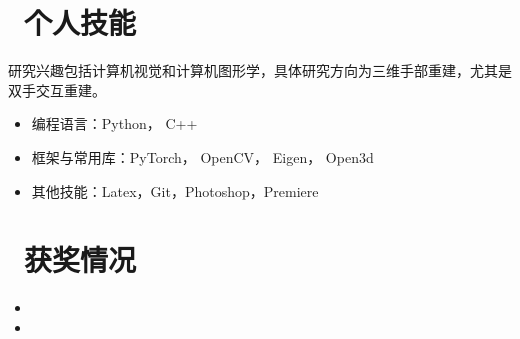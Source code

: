 \documentclass{resume}
\begin{document}
\section{\faCogs\ 个人技能}
研究兴趣包括计算机视觉和计算机图形学，具体研究方向为三维手部重建，尤其是双手交互重建。
\begin{itemize}
  \item 编程语言：Python， C++
  \item 框架与常用库：PyTorch， OpenCV， Eigen， Open3d
  \item 其他技能：Latex，Git，Photoshop，Premiere
\end{itemize}

\section{\faTrophy\ 获奖情况}
\begin{itemize}
    \item{}
    \item {}
\end{itemize}
\end{document}
